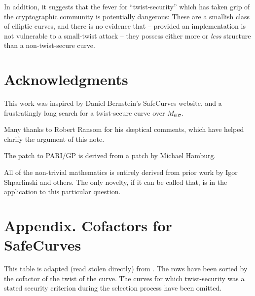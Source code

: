 \documentclass[11pt,fleqn]{article}
\begin{document}
In addition, it suggests that the fever for ``twist-security'' which
has taken grip of the cryptographic community is potentially dangerous:
These are a smallish class of elliptic curves, and there is no evidence that
-- provided an implementation is not vulnerable to a small-twist attack --
they possess either more or \emph{less} structure than a non-twist-secure
curve.

\section{Acknowledgments}

This work was inspired by Daniel Bernstein's SafeCurves website, and a
frustratingly long search for a twist-secure curve over $M_{607}$.

Many thanks to Robert Ransom for his skeptical comments, which have
helped clarify the argument of this note.

The patch to PARI/GP is derived from a patch by Michael Hamburg.

All of the non-trivial mathematics is entirely derived from prior work by
Igor Shparlinski and others. The only novelty, if it can be called that,
is in the application to this particular question.

\section*{Appendix. Cofactors for SafeCurves}

This table is adapted (read stolen directly) from \cite{safecurves}.
The rows have been sorted by the cofactor of the twist of the curve.
The curves for which twist-security was a stated security criterion
during the selection process have been omitted.

%
\end{document}
